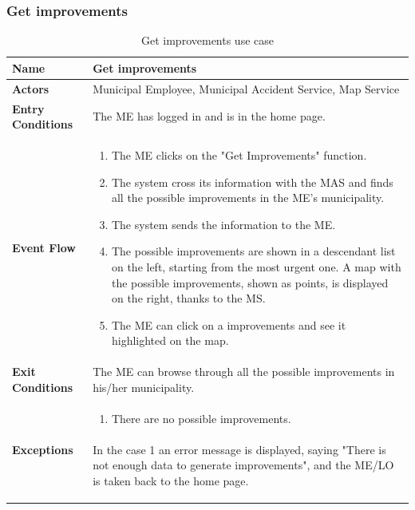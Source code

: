 					
					\clearpage
					\subsubsection{Get improvements}
					\begin{table}[!h]
						\centering
						\vspace{-2mm}
						\begin{tabular}{lp{}}
							\toprule
							\textbf{Name} & \textbf{Get improvements} \\[1mm]
							\midrule
							\textbf{Actors} & Municipal Employee, Municipal Accident Service, Map Service \\[1mm]
							\textbf{Entry Conditions} & The ME has logged in and is in the home page. \vspace{1mm}\\
							\textbf{Event Flow} &
							\vspace{-5mm} 
							\begin{enumerate}
								\setlength\itemsep{0.2mm}
								\item The ME clicks on the "Get Improvements" function.
								\item The system cross its information with the MAS and finds all the possible improvements in the ME's municipality.
								\item The system sends the information to the ME.
								\item The possible improvements are shown in a descendant list on the left, starting from the most urgent one. A map with the possible improvements, shown as points, is displayed on the right, thanks to the MS.
								\item The ME can click on a improvements and see it highlighted on the map.
							\end{enumerate} \\
							\textbf{Exit Conditions} & The ME can browse through all the possible improvements in his/her municipality. \vspace{1mm}\\
							\textbf{Exceptions} & 
								\vspace{-5mm} 
								\begin{enumerate}
									\item There are no possible improvements.
								\end{enumerate}
								\vspace{-7mm}
								\paragraph{}
									In the case 1 an error message is displayed, saying "There is not enough data to generate improvements", and the ME/LO is taken back to the home page. \\
							\bottomrule
						\end{tabular}
						\caption{Get improvements use case}
					\end{table}
					\clearpage
